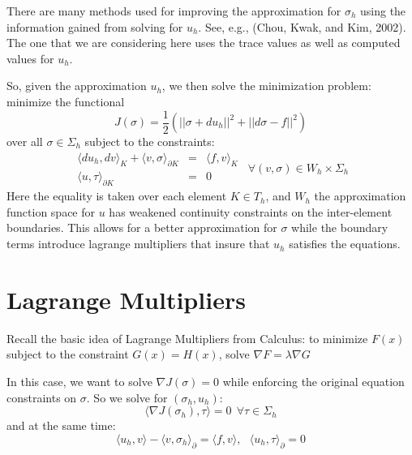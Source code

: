 \documentclass{article}
\begin{document}
There are many methods used for improving the approximation for $\sigma_h$ 
using the information gained from solving for $u_h$. 
See, e.g., (Chou, Kwak, and Kim, 2002). 
The one that we are 
considering here uses the trace values as well as computed values for $u_h$. 

So, given the approximation $u_h$, we then solve the minimization problem:
minimize the functional 
$$J(\sigma)=\frac{1}{2}\left(||\sigma+du_h||^2+||d\sigma-f||^2\right)$$
over all $\sigma\in\Sigma_h$ 
subject to the constraints: 
$$\begin{array}{rcl}
	\langle du_h,dv\rangle_K+\langle v,\sigma\rangle_{\partial K}
		&=&\langle f,v\rangle_K\\
	\langle u,\tau\rangle_{\partial K}&=&0
\end{array}~~\forall (v,\sigma)\in W_h\times\Sigma_h$$
Here the equality is taken over each element $K\in T_h$, and 
$W_h$ the approximation function space for $u$ has weakened continuity 
constraints on the inter-element boundaries. This allows for a better 
approximation for $\sigma$ while the boundary terms introduce lagrange 
multipliers that insure that $u_h$ satisfies the equations.  

\section{Lagrange Multipliers}
Recall the basic idea of Lagrange Multipliers from Calculus: 
to minimize $F(x)$ subject to the constraint $G(x) = H(x)$, 
solve $\nabla F=\lambda\nabla G$ 

In this case, we want to solve $\nabla J(\sigma)=0$ while enforcing 
the original equation constraints on $\sigma$. 
So we solve for $(\sigma_h, u_h)$: 
$$\langle\nabla J(\sigma_h), \tau\rangle = 0~~\forall\tau\in\Sigma_h$$
and at the same time:  
$$
\langle u_h,v\rangle-\langle v,\sigma_h\rangle_\partial=\langle f,v\rangle,~~~
\langle u_h,\tau\rangle_\partial = 0
$$
\end{document}
